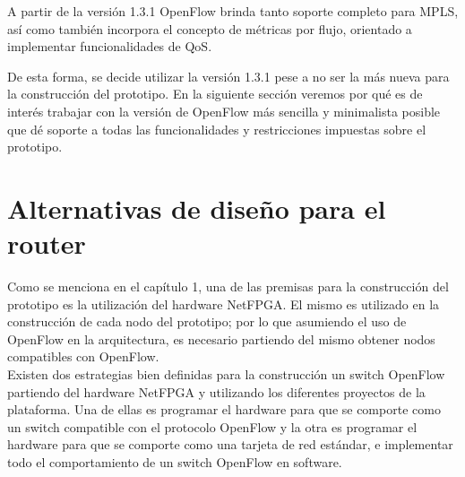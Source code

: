 A partir de la versión 1.3.1 OpenFlow brinda tanto soporte completo para MPLS, así como también incorpora el concepto de métricas por flujo, orientado a implementar funcionalidades de QoS. 

De esta forma, se decide utilizar la versión 1.3.1 pese a no ser la m\'as nueva para la construcción del prototipo. En la siguiente secci\'on veremos por qu\'e es de inter\'es trabajar con la versi\'on de OpenFlow m\'as sencilla y minimalista posible que d\'e soporte a todas las funcionalidades y restricciones impuestas sobre el prototipo.\\ 




\section[Alternativas de dise\~no para el router]{Alternativas de dise\~no para el router}

Como se menciona en el cap\'itulo 1, una de las premisas para la construcción del prototipo es la utilizaci\'on del hardware NetFPGA. El mismo es utilizado en la construcción de cada nodo del prototipo; por lo que asumiendo el uso de OpenFlow en la arquitectura, es necesario partiendo del mismo obtener nodos compatibles con OpenFlow.\\ 

Existen dos estrategias bien definidas para la construcci\'on un switch OpenFlow partiendo del hardware NetFPGA y utilizando los diferentes proyectos de la plataforma. Una de ellas es programar el hardware para que se comporte como un switch compatible con el protocolo OpenFlow y la otra es programar el hardware para que se comporte como una tarjeta de red estándar, e implementar todo el comportamiento de un switch OpenFlow en software.\\

